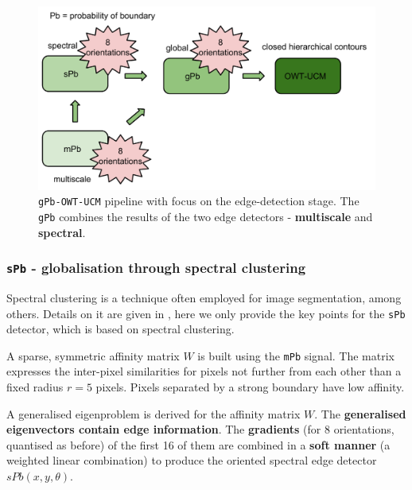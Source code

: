 \begin{figure}[ht!]
\centering
\includegraphics[width=1\textwidth]{images/gPb-OWT-UCM/gPb-algorithm-details-mPb_sPb_gPb.pdf}
\caption[{\tt gPb-OWT-UCM} pipeline with focus on the edge-detection stage - {\tt gPb}]{{\tt gPb-OWT-UCM} pipeline with focus on the edge-detection stage. The {\tt gPb} combines the results of the two edge detectors - {\bf multiscale} and {\bf spectral}.}
\label{fig:gPb-algorithm-details-mPb_sPb_gPb}
\end{figure}

\subsubsection{{\tt sPb} - globalisation through spectral clustering}

Spectral clustering is a technique often employed for image segmentation, among others. Details on it are given in \cite{Leung1998contour,Shi2000normalized,Fowlkes2003learning,Fowlkes04}, here we only provide the key %
points for the %
{\tt sPb} detector, which is based on %
spectral clustering. 

A sparse, symmetric affinity matrix $W$ is built using the {\tt mPb} signal. The matrix expresses the inter-pixel similarities for pixels not further from each other than a fixed radius $r=5$ pixels. Pixels separated by a strong boundary have low affinity.


A generalised eigenproblem is derived for the affinity matrix $W$. The {\bf generalised eigenvectors contain edge information}. %
The {\bf gradients} %
(for 8 orientations, quantised as before) of the first 16 %
of them %
are combined in a {\bf soft manner} (a weighted linear combination) %
to produce the oriented spectral edge detector $sPb(x,y,\theta)$.

